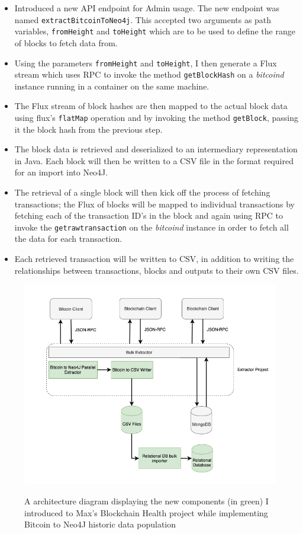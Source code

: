 \begin{itemize}
    \item Introduced a new API endpoint for Admin usage. The new endpoint was named \texttt{extractBitcoinToNeo4j}. This accepted two arguments as path variables, \texttt{fromHeight} and \texttt{toHeight} which are to be used to define the range of blocks to fetch data from. 
    \item Using the parameters \texttt{fromHeight} and \texttt{toHeight}, I then generate a Flux stream which uses RPC to invoke the method \texttt{getBlockHash} on a \textit{bitcoind} instance running in a container on the same machine. 
    \item The Flux stream of block hashes are then mapped to the actual block data using flux's \texttt{flatMap} operation and by invoking the method \texttt{getBlock}, passing it the block hash from the previous step. 
    \item The block data is retrieved and deserialized to an intermediary representation in Java. Each block will then be written to a CSV file in the format required for an import into Neo4J. 
    \item The retrieval of a single block will then kick off the process of fetching transactions; the Flux of blocks will be mapped to individual transactions by fetching each of the transaction ID's in the block and again using RPC to invoke the \texttt{getrawtransaction} on the \textit{bitcoind} instance in order to fetch all the data for each transaction. 
    \item Each retrieved transaction will be written to CSV, in addition to writing the relationships between transactions, blocks and outputs to their own CSV files. 
\end{itemize}

\begin{figure}[h!]
  \centering
  \includegraphics[width = 15cm]{./figures/adding-bitcoin-extractor-diagram}\\[0.5cm] 
  \caption{A architecture diagram displaying the new components (in green) I introduced to Max's Blockchain Health project while implementing Bitcoin to Neo4J historic data population}
  \label{fig:neo4j-layout}
\end{figure}

